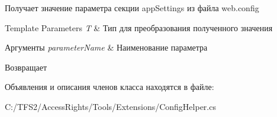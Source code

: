 Получает значение параметра секции app\+Settings из файла web.\+config 


\begin{DoxyTemplParams}{Template Parameters}
{\em T} & Тип для преобразования полученного значения\\
\hline
\end{DoxyTemplParams}

\begin{DoxyParams}{Аргументы}
{\em parameter\+Name} & Наименование параметра\\
\hline
\end{DoxyParams}
\begin{DoxyReturn}{Возвращает}

\end{DoxyReturn}


Объявления и описания членов класса находятся в файле\+:\begin{DoxyCompactItemize}
\item 
C\+:/\+T\+F\+S2/\+Access\+Rights/\+Tools/\+Extensions/Config\+Helper.\+cs\end{DoxyCompactItemize}
